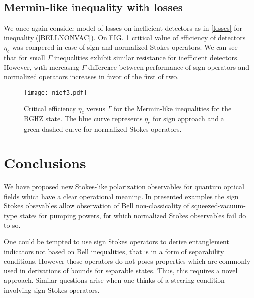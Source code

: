\documentclass[aps,pra, twocolumn, showpacs]{revtex4-2}
\begin{document}
\subsection{Mermin-like inequality with losses}
We once again consider model of losses on inefficient detectors as in \ref{losses} for inequality (\ref{BELLNONVAC}). On FIG. \ref{nief} critical value of efficiency of detectors $\eta_{c}$ was compered in case of sign and normalized Stokes operators. We can see that for small $\Gamma$ inequalities exhibit similar resistance for inefficient detectors. However, with increasing $\Gamma$  difference between performance of sign operators and normalized operators increases in favor of the first of two.

\begin{figure}[h!]
\centering
\texttt{[image: nief3.pdf]} 
\caption{Critical efficiency $\eta_c$ versus $\Gamma$ for the Mermin-like inequalities for the BGHZ state. The blue curve represents $\eta_c$ for sign approach and a green dashed curve for normalized Stokes operators.}
\label{nief}
\end{figure}

\section{Conclusions}
We have proposed new Stokes-like polarization observables for quantum optical fields which have a clear operational meaning. In presented examples the sign Stokes obsevables allow  observation of Bell non-classicality of squeezed-vacuum-type states for pumping powers, for which normalized Stokes observables fail do to so. %



One could be tempted to use sign Stokes operators to derive entanglement indicators not based on Bell inequalities, that is in a form of separability conditions. However those operators do not poses properties which are commonly used in  derivations of bounds for separable states. Thus, this requires a  novel approach. Similar questions arise when one thinks of a steering condition involving sign Stokes operators.
\end{document}
